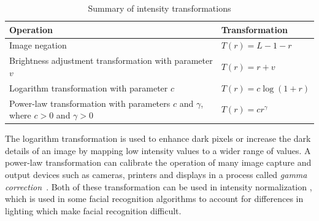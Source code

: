 \begin{table}[ht]
	\caption{Summary of intensity transformations}
	\label{tab:imageoperation_summary}
    \begin{tabular}{
        p{}
        p{}}
		\toprule
		Operation & Transformation\\
        \midrule
            Image negation &
            $T\left(r\right) = L-1-r$
            \\
            Brightness adjustment transformation with parameter $v$ &
            $T\left(r\right) = r+v$
            \\
            Logarithm transformation with parameter $c$ &
            $T\left(r\right) = c \log\left(1 + r\right)$\\
            Power-law transformation with parameters $c$ and $\gamma$, where $c>0$ and $\gamma > 0$&
            $T\left(r\right) = c r^{\gamma}$\\
	    \bottomrule
    \end{tabular}
\end{table}
The logarithm transformation is used to enhance dark pixels or increase the dark details of an image by mapping low intensity values to a wider range of values. A power-law transformation can calibrate the operation of many image capture and output devices such as cameras, printers and displays in a process called \textit{gamma correction}~\cite{gonzalez_digital_2008}. Both of these transformation can be used in intensity normalization \cite{oravec_illumination_2010}, which is used in some facial recognition algorithms to account for differences in lighting which make facial recognition difficult.

